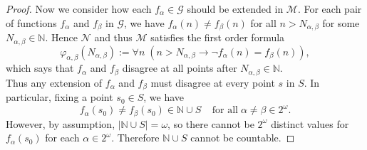 \documentclass{article}
\begin{document}
\begin{enumerate}[label={\bf Q\arabic*:}]
\begin{enumerate}
\begin{proof}
          Now we consider how each $f_\alpha\in\mathcal{G}$ should be
          extended in $\mathcal{M}$. For each pair of functions $f_\alpha$
          and $f_\beta$ in $\mathcal{G}$, we have $f_\alpha(n)\neq
          f_\beta(n)$ for all $n>N_{\alpha,\beta}$ for some
          $N_{\alpha,\beta}\in\mathbb{N}$.  Hence $\mathcal{N}$ and thus
          $\mathcal{M}$ satisfies the first order formula
          \begin{equation*}
            \varphi_{\alpha,\beta}(N_{\alpha,\beta}) := \forall n\;
            (n>N_{\alpha,\beta}\rightarrow \neg f_\alpha(n)=f_\beta(n)),
          \end{equation*}
          which says that $f_\alpha$ and $f_\beta$ disagree at all points
          after $N_{\alpha,\beta}\in\mathbb{N}$. \\

          Thus any extension of $f_\alpha$ and $f_\beta$ must disagree at
          every point $s$ in $S$. In particular, fixing a point $s_0\in
          S$, we have
          \begin{equation*}
            f_\alpha(s_0)\neq f_\beta(s_0)\in\mathbb{N}\cup S\;\;\;\;
            \text{for all}\; \alpha\neq\beta\in2^\omega.
          \end{equation*}
          However, by assumption, $|\mathbb{N}\cup S|=\omega$, so there
          cannot be $2^\omega$ distinct values for $f_\alpha(s_0)$ for each
          $\alpha\in2^\omega$. Therefore $\mathbb{N}\cup S$ cannot be
          countable.
        \end{proof}
    \end{enumerate}
\end{enumerate}
\end{document}
